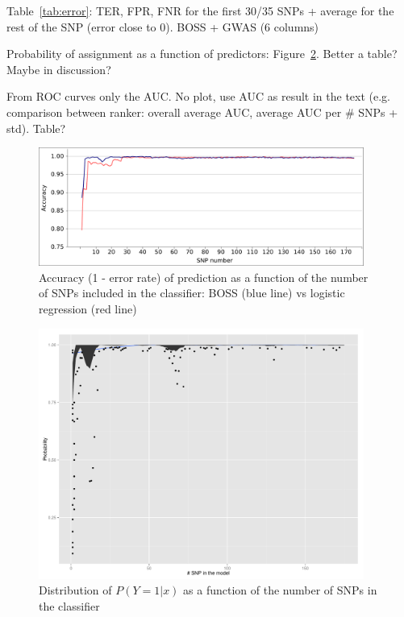 Table~\ref{tab:error}: TER, FPR, FNR for the first 30/35 SNPs + average for the
rest of the SNP (error close to $0$). BOSS + GWAS (6 columns)


Probability of assignment as a function of predictors:
Figure~\ref{fig:probability}. Better a table? Maybe in discussion?

From ROC curves only the AUC. No plot, use AUC as result in the text (e.g.
comparison between ranker: overall average AUC, average AUC per \# SNPs
+ std). Table?

\begin{figure}
\includegraphics[width=0.95\textwidth]{accuracy.pdf}
\caption{Accuracy (1 - error rate) of prediction as a function of the
  number of SNPs included in the classifier: BOSS (blue line) vs
  logistic regression (red line)}
\label{fig:accuracy}       %
\end{figure}

\begin{figure}
\includegraphics[width=0.95\textwidth]{probabilities.pdf}
\caption{Distribution of $P(Y=1|x)$ as a function of the number of SNPs
  in the classifier}
\label{fig:probability} 
\end{figure}


